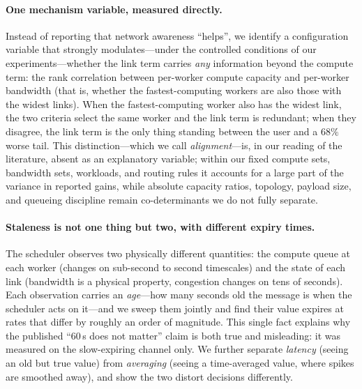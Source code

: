 \paragraph{One mechanism variable, measured directly.}
Instead of reporting that network awareness ``helps'', we identify a configuration variable that
strongly modulates---under the controlled conditions of our experiments---whether the link term
carries \emph{any} information beyond the compute term: the
rank correlation between per-worker compute capacity and per-worker bandwidth (that is, whether
the fastest-computing workers are also those with the widest links). When the
fastest-computing worker also has the widest link, the two criteria select the same worker and
the link term is redundant; when they disagree, the link term is the only thing standing between
the user and a $68\%$ worse tail. This distinction---which we call \emph{alignment}---is, in our
reading of the literature, absent as an explanatory variable; within our fixed compute sets,
bandwidth sets, workloads, and routing rules it accounts for a large part
of the variance in reported gains, while absolute capacity ratios, topology, payload size, and
queueing discipline remain co-determinants we do not fully separate.

\paragraph{Staleness is not one thing but two, with different expiry times.}
The scheduler observes two physically different quantities: the compute queue at each worker
(changes on sub-second to second timescales) and the state of each link (bandwidth is a physical
property, congestion changes on tens of seconds). Each observation carries an \emph{age}---how
many seconds old the message is when the scheduler acts on it---and we sweep them jointly and find their value
expires at rates that differ by roughly an order of magnitude. This single fact explains why
the published ``60\,s does not matter'' claim is both true and misleading: it was measured on the
slow-expiring channel only. We further separate \emph{latency} (seeing an old but true value)
from \emph{averaging} (seeing a time-averaged value, where spikes are smoothed away), and show
the two distort decisions differently.

